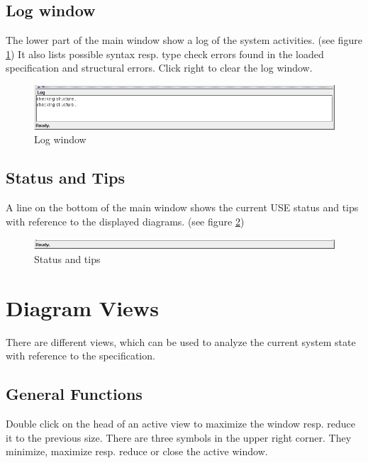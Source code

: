 \documentclass[a4paper,titlepage,oneside,final]{scrreprt} %
\begin{document}
\subsection{Log window}\label{logWindow}
The lower part of the main window show a log of the system activities. (see figure \ref{fig:LogWindow})
It also lists
possible syntax resp. type check errors found in the loaded specification and
structural errors. Click right to clear the log window.
\begin{figure}[ht]
\centering
\includegraphics[scale=0.5]{Screenshots/GUI/Views/LogWindow.png}
\caption{Log window}
\label{fig:LogWindow}
\end{figure}
\subsection{Status and Tips}
A line on the bottom of the main window shows the current USE status and
tips with reference to the displayed diagrams. (see figure \ref{fig:StatusAndTips})
\begin{figure}[ht]
\centering
\includegraphics[scale=0.5]{Screenshots/GUI/Views/StatusAndTips.png}
\caption{Status and tips}
\label{fig:StatusAndTips}
\end{figure}
\section{Diagram Views}
There are different views, which can be used to analyze the current system state
with reference to the specification.
\subsection{General Functions}
Double click on the head of an active view to maximize the window resp. reduce it to the
previous size. There are three symbols in the upper right corner. They
minimize, maximize resp. reduce or close the active window.
\end{document}
